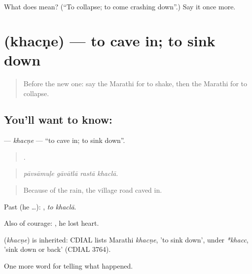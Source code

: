 \begin{tcolorbox}[breakable,colback=teal!4,colframe=teal!35!black,title={Before you move on}]
What does  mean? (\textquotedblleft{}To collapse; to come crashing down\textquotedblright{}.) Say it once more.
\end{tcolorbox}
\section[\texorpdfstring{\mr{खचणे} (khacṇe)}{खचणे (khacṇe)}]{ (khacṇe) — to cave in; to sink down}

\label{lesson:MR-C293-khacne}



\begin{quote}
Before the new one: say the Marathi for to shake, then the Marathi for to collapse.
\end{quote}

\subsection*{You'll want to know: }
\textbf{} — \emph{khacṇe} — \textquotedblleft{}to cave in; to sink down\textquotedblright{}.

\begin{quote}
   .
\end{quote}

\begin{quote}
\emph{pāvsāmuḷe gāvātlā rastā khaclā.}
\end{quote}

\begin{quote}
Because of the rain, the village road caved in.
\end{quote}

Past (he …):  , \emph{to khaclā}.

Also of courage:   , he lost heart.

\begin{cousinweb}
\textbf{} (\emph{khacṇe}) is inherited: CDIAL lists Marathi \emph{khacṇe}, 'to sink down', under \emph{*khacc}, 'sink down or back' (CDIAL 3764).
\end{cousinweb}

\begin{grammarlens}[title={What you've built}]
One more word for telling what happened.
\end{grammarlens}

